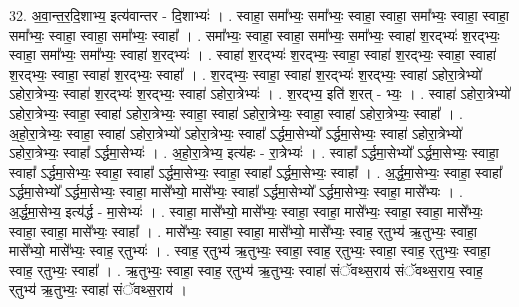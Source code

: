 \documentclass[17pt]{extarticle}
\begin{document}
32. अ॒वा॒न्त॒र॒दि॒शाभ्य॒ इत्य॑वान्तर - दि॒शाभ्यः॑ । . स्वाहा॒ समा᳚भ्यः॒ समा᳚भ्यः॒ स्वाहा॒ स्वाहा॒ समा᳚भ्यः॒ स्वाहा॒ स्वाहा॒ समा᳚भ्यः॒ स्वाहा॒ स्वाहा॒ समा᳚भ्यः॒ स्वाहा᳚ । . समा᳚भ्यः॒ स्वाहा॒ स्वाहा॒ समा᳚भ्यः॒ समा᳚भ्यः॒ स्वाहा॑ श॒रद्भ्यः॑ श॒रद्भ्यः॒ स्वाहा॒ समा᳚भ्यः॒ समा᳚भ्यः॒ स्वाहा॑ श॒रद्भ्यः॑ । . स्वाहा॑ श॒रद्भ्यः॑ श॒रद्भ्यः॒ स्वाहा॒ स्वाहा॑ श॒रद्भ्यः॒ स्वाहा॒ स्वाहा॑ श॒रद्भ्यः॒ स्वाहा॒ स्वाहा॑ श॒रद्भ्यः॒ स्वाहा᳚ । . श॒रद्भ्यः॒ स्वाहा॒ स्वाहा॑ श॒रद्भ्यः॑ श॒रद्भ्यः॒ स्वाहा॑ ऽहोरा॒त्रेभ्यो॑ ऽहोरा॒त्रेभ्यः॒ स्वाहा॑ श॒रद्भ्यः॑ श॒रद्भ्यः॒ स्वाहा॑ ऽहोरा॒त्रेभ्यः॑ । . श॒रद्भ्य॒ इति॑ श॒रत् - भ्यः॒ । . स्वाहा॑ ऽहोरा॒त्रेभ्यो॑ ऽहोरा॒त्रेभ्यः॒ स्वाहा॒ स्वाहा॑ ऽहोरा॒त्रेभ्यः॒ स्वाहा॒ स्वाहा॑ ऽहोरा॒त्रेभ्यः॒ स्वाहा॒ स्वाहा॑ ऽहोरा॒त्रेभ्यः॒ स्वाहा᳚ । . अ॒हो॒रा॒त्रेभ्यः॒ स्वाहा॒ स्वाहा॑ ऽहोरा॒त्रेभ्यो॑ ऽहोरा॒त्रेभ्यः॒ स्वाहा᳚ ऽर्द्धमा॒सेभ्यो᳚ ऽर्द्धमा॒सेभ्यः॒ स्वाहा॑ ऽहोरा॒त्रेभ्यो॑ ऽहोरा॒त्रेभ्यः॒ स्वाहा᳚ ऽर्द्धमा॒सेभ्यः॑ । . अ॒हो॒रा॒त्रेभ्य॒ इत्य॑हः - रा॒त्रेभ्यः॑ । . स्वाहा᳚ ऽर्द्धमा॒सेभ्यो᳚ ऽर्द्धमा॒सेभ्यः॒ स्वाहा॒ स्वाहा᳚ ऽर्द्धमा॒सेभ्यः॒ स्वाहा॒ स्वाहा᳚ ऽर्द्धमा॒सेभ्यः॒ स्वाहा॒ स्वाहा᳚ ऽर्द्धमा॒सेभ्यः॒ स्वाहा᳚ । . अ॒र्द्ध॒मा॒सेभ्यः॒ स्वाहा॒ स्वाहा᳚ ऽर्द्धमा॒सेभ्यो᳚ ऽर्द्धमा॒सेभ्यः॒ स्वाहा॒ मासे᳚भ्यो॒ मासे᳚भ्यः॒ स्वाहा᳚ ऽर्द्धमा॒सेभ्यो᳚ ऽर्द्धमा॒सेभ्यः॒ स्वाहा॒ मासे᳚भ्यः । . अ॒र्द्ध॒मा॒सेभ्य॒ इत्य॑र्द्ध - मा॒सेभ्यः॑ । . स्वाहा॒ मासे᳚भ्यो॒ मासे᳚भ्यः॒ स्वाहा॒ स्वाहा॒ मासे᳚भ्यः॒ स्वाहा॒ स्वाहा॒ मासे᳚भ्यः॒ स्वाहा॒ स्वाहा॒ मासे᳚भ्यः॒ स्वाहा᳚ । . मासे᳚भ्यः॒ स्वाहा॒ स्वाहा॒ मासे᳚भ्यो॒ मासे᳚भ्यः॒ स्वाह॒ र्‌तुभ्य॑ ऋ॒तुभ्यः॒ स्वाहा॒ मासे᳚भ्यो॒ मासे᳚भ्यः॒ स्वाह॒ र्‌तुभ्यः॑ । . स्वाह॒ र्‌तुभ्य॑ ऋ॒तुभ्यः॒ स्वाहा॒ स्वाह॒ र्‌तुभ्यः॒ स्वाहा॒ स्वाह॒ र्‌तुभ्यः॒ स्वाहा॒ स्वाह॒ र्‌तुभ्यः॒ स्वाहा᳚ । . ऋ॒तुभ्यः॒ स्वाहा॒ स्वाह॒ र्‌तुभ्य॑ ऋ॒तुभ्यः॒ स्वाहा॑ संॅवथ्स॒राय॑ संॅवथ्स॒राय॒ स्वाह॒ र्‌तुभ्य॑ ऋ॒तुभ्यः॒ स्वाहा॑ संॅवथ्स॒राय॑ । \newline
\end{document}
